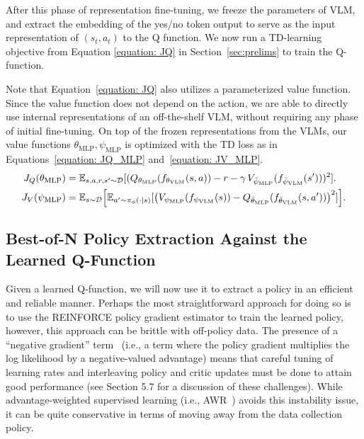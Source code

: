 After this phase of representation fine-tuning, we freeze the parameters of VLM, and extract the embedding of the yes/no token output to serve as the input representation of $(s_t, a_t)$ to the Q function. We now run a TD-learning objective from Equation \ref{equation: JQ} in Section~\ref{sec:prelims} to train the Q-function.

Note that Equation~\ref{equation: JQ} also utilizes a parameterized value function. Since the value function does not depend on the action, we are able to directly use internal representations of an off-the-shelf VLM, without requiring any phase of initial fine-tuning. On top of the frozen representations from the VLMs, our value functions $\theta_{\mathrm{MLP}}, \psi_{\mathrm{MLP}}$ is optimized with the TD loss as in Equations~\ref{equation: JQ_MLP} and~\ref{equation: JV_MLP}.
\begin{align}
J_Q(\theta_{\mathrm{MLP}}) 
&= \EE_{s,a,r,s' \sim \Dcal}[
(Q_{\theta_{\mathrm{MLP}}}(f_{\theta_{\mathrm{VLM}}}(s,a)) - r - \gamma \,
  V_{\bar{\psi}_{\mathrm{MLP}}}(f_{\bar{\psi}_{\mathrm{VLM}}}(s')))^2].
\label{equation: JQ_MLP} \\  %
J_V(\psi_{\mathrm{MLP}})
&= \EE_{s \sim \Dcal}\Bigl[\EE_{a' \sim \pi_\phi(\cdot|s)}[
\bigl(V_{\psi_{\mathrm{MLP}}}(f_{\psi_{\mathrm{VLM}}}(s)) 
 - Q_{\bar{\theta}_{\mathrm{MLP}}}(f_{\bar{\theta}_{\mathrm{VLM}}}(s,a'))\bigr)^2]\Bigr].
\label{equation: JV_MLP}
\end{align}

\vspace{-0.4cm}
\subsection{Best-of-N Policy Extraction Against the Learned Q-Function} \label{sec:method-actor}
\vspace{-0.1cm}
Given a learned Q-function, we will now use it to extract a policy in an efficient and reliable manner. Perhaps the most straightforward approach for doing so is to use the REINFORCE policy gradient estimator to train the learned policy, however, this approach can be brittle with off-policy data. The presence of a ``negative gradient'' term~\cite{tajwar2024preferencefinetuningllmsleverage} (i.e., a term where the policy gradient multiplies the log likelihood by a negative-valued advantage) means that careful tuning of learning rates and interleaving policy and critic updates must be done to attain good performance (see \citet{zhou2024archertraininglanguagemodel} Section 5.7 for a discussion of these challenges).
While advantage-weighted supervised learning (i.e., AWR~\citep{peng2019advantageweightedregressionsimplescalable}) avoids this instability issue, it can be quite conservative in terms of moving away from the data collection policy.

